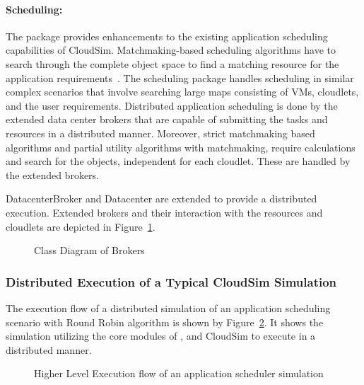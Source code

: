 \paragraph*{Scheduling:}
The  package provides enhancements to the existing application scheduling capabilities of CloudSim. Matchmaking-based scheduling algorithms have to search through the complete object space to find a matching resource for the application requirements~\cite{mm,mm2}. The scheduling package handles scheduling in similar complex scenarios that involve searching large maps consisting of VMs, cloudlets, and the user requirements. Distributed application scheduling is done by the extended data center brokers that are capable of submitting the tasks and resources in a distributed manner. Moreover, strict matchmaking based algorithms and partial utility algorithms with matchmaking, require calculations and search for the objects, independent for each cloudlet. These are handled by the extended brokers.

DatacenterBroker and Datacenter are extended to provide a distributed execution. Extended brokers and their interaction with the resources and cloudlets are depicted in Figure~\ref{fig:classDiagram}.

\begin{figure}[!htbp]
\begin{center}
\end{center}
 \caption{Class Diagram of  Brokers}
 \label{fig:classDiagram}
\end{figure}

\subsubsection{Distributed Execution of a Typical CloudSim Simulation}
The execution flow of a distributed simulation of an application scheduling scenario with Round Robin algorithm is shown by Figure~\ref{fig:flowmin}. It shows the simulation utilizing the core modules of , and CloudSim to execute in a distributed manner. 
\begin{figure}[!h]
\begin{center}
\end{center}
 \caption{Higher Level Execution flow of an application scheduler simulation}
 \label{fig:flowmin}
\end{figure}

